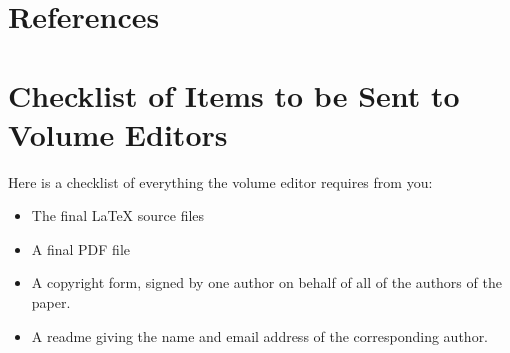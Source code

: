 \documentclass[runningheads,a4paper]{llncs}
\begin{document}

\section{References}\label{references}


\section{Checklist of Items to be Sent to Volume Editors}
Here is a checklist of everything the volume editor requires from you:

\begin{itemize}
\settowidth{\leftmargin}{{\Large$\square$}}\advance\leftmargin{}
\itemsep8pt\relax
\renewcommand\labelitemi{{\lower1.5pt\hbox{\Large$\square$}}}

\item The final \LaTeX{} source files
\item A final PDF file
\item A copyright form, signed by one author on behalf of all of the
authors of the paper.
\item A readme giving the name and email address of the
corresponding author.
\end{itemize}
\end{document}
